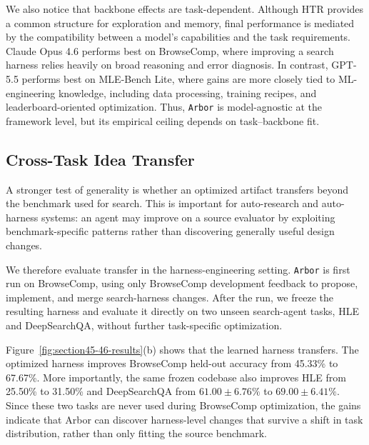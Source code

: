 \documentclass{llmxive}
\providecommand{\arbor}{\texttt{Arbor}}
\providecommand{\htr}{\textsc{HTR}}
\begin{document}
We also notice that backbone effects are task-dependent. Although
\htr{} provides a common structure for exploration and memory, final
performance is mediated by the compatibility between a model's capabilities and
the task requirements. Claude Opus 4.6 performs best on BrowseComp, where
improving a search harness relies heavily on broad reasoning and error
diagnosis. In contrast, GPT-5.5 performs best on MLE-Bench Lite, where gains are
more closely tied to ML-engineering knowledge, including data processing,
training recipes, and leaderboard-oriented optimization. Thus, \arbor{} is
model-agnostic at the framework level, but its empirical ceiling depends on
task--backbone fit.


\subsection{Cross-Task Idea Transfer}
\label{sec:exp-transfer}

A stronger test of generality is whether an optimized artifact transfers beyond the benchmark used for search. This is important for auto-research and auto-harness systems: an agent may improve on a source evaluator by exploiting benchmark-specific patterns rather than discovering generally useful design changes.

We therefore evaluate transfer in the harness-engineering setting. \arbor{} is first run on BrowseComp, using only BrowseComp development feedback to propose, implement, and merge search-harness changes. After the run, we freeze the resulting harness and evaluate it directly on two unseen search-agent tasks, HLE and DeepSearchQA, without further task-specific optimization.

Figure~\ref{fig:section45-46-results}(b) shows that the learned harness transfers. The optimized harness improves BrowseComp held-out accuracy from 45.33\% to 67.67\%. More importantly, the same frozen codebase also improves HLE from 25.50\% to 31.50\% and DeepSearchQA from $61.00\pm6.76\%$ to $69.00\pm6.41\%$. Since these two tasks are never used during BrowseComp optimization, the gains indicate that Arbor can discover harness-level changes that survive a shift in task distribution, rather than only fitting the source benchmark.
\end{document}

